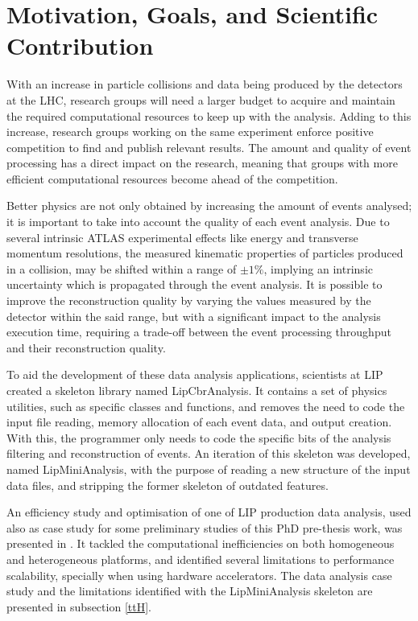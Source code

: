 \section{Motivation, Goals, and Scientific Contribution}
\label{motivation}

With an increase in particle collisions and data being produced by the detectors at the LHC, research groups will need a larger budget to acquire and maintain the required computational resources to keep up with the analysis. Adding to this increase, research groups working on the same experiment enforce positive competition to find and publish relevant results. The amount and quality of event processing has a direct impact on the research, meaning that groups with more efficient computational resources become ahead of the competition.

Better physics are not only obtained by increasing the amount of events analysed; it is important to take into account the quality of each event analysis. Due to several intrinsic ATLAS experimental effects like energy and transverse momentum resolutions, the measured kinematic properties of particles produced in a collision, may be shifted within a range of $\pm1\%$, implying an intrinsic uncertainty which is propagated through the event analysis. It is possible to improve the reconstruction quality by varying the values measured by the detector within the said range, but with a significant impact to the analysis execution time, requiring a trade-off between the event processing throughput and their reconstruction quality.

To aid the development of these data analysis applications, scientists at LIP created a skeleton library named LipCbrAnalysis. It contains a set of physics utilities, such as specific classes and functions, and removes the need to code the input file reading, memory allocation of each event data, and output creation. With this, the programmer only needs to code the specific bits of the analysis filtering and reconstruction of events. An iteration of this skeleton was developed, named LipMiniAnalysis, with the purpose of reading a new structure of the input data files, and stripping the former skeleton of outdated features.

An efficiency study and optimisation of one of LIP production data analysis, used also as case study for some preliminary studies of this PhD pre-thesis work, was presented in \cite{Msc:AMP,paperAMP}. It tackled the computational inefficiencies on both homogeneous and heterogeneous platforms, and identified several limitations to performance scalability, specially when using hardware accelerators. The data analysis case study and the limitations identified with the LipMiniAnalysis skeleton are presented in subsection \ref{ttH}.

